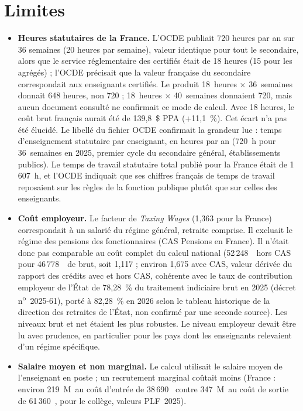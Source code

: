 \documentclass[11pt,a4paper]{article}
\providecommand{\euro}{\texteuro}
\begin{document}
\section{Limites}
\begin{itemize}
\item \textbf{Heures statutaires de la France.} L'OCDE publiait 720 heures par an sur 36 semaines (20 heures par semaine), valeur identique pour tout le secondaire, alors que le service réglementaire des certifiés était de 18 heures (15 pour les agrégés) ; l'OCDE précisait que la valeur française du secondaire correspondait aux enseignants certifiés. Le produit 18~heures $\times$ 36~semaines donnait 648 heures, non 720 ; 18~heures $\times$ 40~semaines donnaient 720, mais aucun document consulté ne confirmait ce mode de calcul. Avec 18 heures, le coût brut français aurait été de 139,8~\$ PPA (+11,1~\%). Cet écart n'a pas été élucidé. Le libellé du fichier OCDE confirmait la grandeur lue : temps d'enseignement statutaire par enseignant, en heures par an (720~h pour 36~semaines en 2025, premier cycle du secondaire général, établissements publics). Le temps de travail statutaire total publié pour la France était de 1\,607~h, et l'OCDE indiquait que ses chiffres français de temps de travail reposaient sur les règles de la fonction publique plutôt que sur celles des enseignants.
\item \textbf{Coût employeur.} Le facteur de \emph{Taxing Wages} (1,363 pour la France) correspondait à un salarié du régime général, retraite comprise. Il excluait le régime des pensions des fonctionnaires (CAS Pensions en France). Il n'était donc pas comparable au coût complet du calcul national (52\,248~\euro\  hors CAS pour 46\,778~\euro\  de brut, soit 1,117 ; environ 1,675 avec CAS, valeur dérivée du rapport des crédits avec et hors CAS, cohérente avec le taux de contribution employeur de l'État de 78,28~\% du traitement indiciaire brut en 2025 (décret n\textsuperscript{o}~2025-61), porté à 82,28~\% en 2026 selon le tableau historique de la direction des retraites de l'État, non confirmé par une seconde source). Les niveaux brut et net étaient les plus robustes. Le niveau employeur devait être lu avec prudence, en particulier pour les pays dont les enseignants relevaient d'un régime spécifique.
\item \textbf{Salaire moyen et non marginal.} Le calcul utilisait le salaire moyen de l'enseignant en poste ; un recrutement marginal coûtait moins (France : environ 219~M\euro\  au coût d'entrée de 38\,690~\euro{}  contre 347~M\euro\  au coût de sortie de 61\,360~\euro, pour le collège, valeurs PLF~2025).

\end{itemize}
\end{document}
